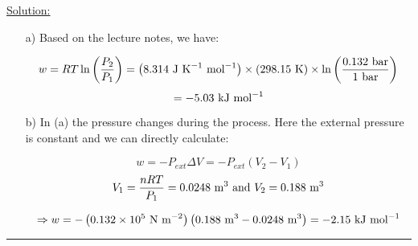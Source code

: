 \noindent
\underline{Solution:}\\

\begin{itemize}
\item[a)] Based on the lecture notes, we have:

$$w = RT\ln\left(\frac{P_2}{P_1}\right) = \left(8.314\textnormal{ J K}^{-1}\textnormal{ mol}^{-1}\right)\times\left(298.15\textnormal{ K}\right)\times\ln\left(\frac{0.132\textnormal{ bar}}{1\textnormal{ bar}}\right)$$
$$ = -5.03\textnormal{ kJ mol}^{-1}$$

\item[b)] In (a) the pressure changes during the process. Here the external pressure is constant and we can directly calculate:

$$w = -P_{ext}\Delta V = -P_{ext}\left(V_2 - V_1\right)$$
$$V_1 = \frac{nRT}{P_1} = 0.0248\textnormal{ m}^3\textnormal{ and }V_2 = 0.188\textnormal{ m}^3$$

$$\Rightarrow w = -\left(0.132\times 10^5\textnormal{ N m}^{-2}\right)\left(0.188\textnormal{ m}^3 - 0.0248\textnormal{ m}^3\right) = -2.15\textnormal{ kJ mol}^{-1}$$

\end{itemize}

\hrule\vspace{0.5cm}
